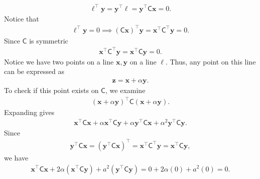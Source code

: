 \documentclass{report}
\begin{document}
\begin{itemize}
\begin{align*}
                \mathbf{\ell}^{\mathsf{\top}}\mathbf{y} = \mathbf{y}^{\mathsf{\top}}\mathbf{\ell} = \mathbf{y}^{\mathsf{\top}}\mathsf{C}\mathbf{x} = 0
            .\end{align*}
            Notice that 
            \begin{align*}
                \mathbf{\ell}^{\mathsf{\top}}\mathbf{y} = 0 \implies (\mathsf{C}\mathbf{x})^{\mathsf{\top}}\mathbf{y} = \mathbf{x}^{\top}\mathsf{C}^{\mathsf{\top}}\mathbf{y} = 0
            .\end{align*}
            Since $\mathsf{C}$ is symmetric
            \begin{align*}
                \mathbf{x}^{\top}\mathsf{C}^{\mathsf{\top}}\mathbf{y} = \mathbf{x}^{\top}\mathsf{C}\mathbf{y}   = 0
            .\end{align*}
            Notice we have two points on a line $\mathbf{x}, \mathbf{y}$ on a line $\mathbf{\ell}$. Thus, any point on this line can be expressed as 
            \begin{align*}
                \mathbf{z} = \mathbf{x} + \alpha\mathbf{y}
            .\end{align*}
            To check if this point exists on $\mathsf{C}$, we examine
            \begin{align*}
                (\mathbf{x} + \alpha \mathbf{y})^{\mathsf{\top}}\mathsf{C}(\mathbf{x} + \alpha\mathbf{y})
            .\end{align*}
            Expanding gives 
            \begin{align*}
                \mathbf{x}^{\mathsf{\top}}\mathsf{C}\mathbf{x} + \alpha\mathbf{x}^{\mathsf{\top}}\mathsf{C}\mathbf{y} + \alpha\mathbf{y}^{\mathsf{\top}}\mathsf{C}\mathbf{x} + \alpha^{2}\mathbf{y}^{\mathsf{\top}}\mathsf{C}\mathbf{y}
            .\end{align*}
            Since
            \begin{align*}
                \mathbf{y}^{\mathsf{\top}}\mathsf{C}\mathbf{x} = (\mathbf{y}^{\mathsf{\top}}\mathsf{C}\mathbf{x})^{\mathsf{\top}} = \mathbf{x}^{\mathsf{\top}}\mathsf{C}^{\mathsf{\top}}\mathbf{y} = \mathbf{x}^{\mathsf{\top}}\mathsf{C}\mathbf{y}
            ,\end{align*}
            we have
            \begin{align*}
               \mathbf{x}^{\mathsf{\top}}\mathsf{C}\mathbf{x} + 2\alpha(\mathbf{x}^{\mathsf{\top}}\mathsf{C}\mathbf{y})  + a^{2}(\mathbf{y}^{\mathsf{\top}}\mathsf{C}\mathbf{y}) = 0 + 2\alpha(0) + a^{2}(0) = 0
            .\end{align*}

\end{itemize}
\end{document}

